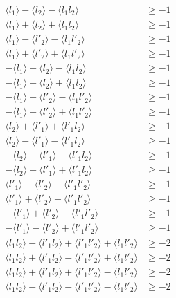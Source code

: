 \begin{equation}
\begin{aligned}\label{eq:nonmodineq}
\langle l_1 \rangle - \langle l_2 \rangle - \langle l_1 l_2 \rangle &\geq -1\\
\langle l_1 \rangle + \langle l_2 \rangle + \langle l_1 l_2 \rangle &\geq -1\\
\langle l_1 \rangle - \langle l'_2 \rangle - \langle l_1 l'_2 \rangle &\geq -1\\
\langle l_1 \rangle + \langle l'_2 \rangle + \langle l_1 l'_2 \rangle &\geq -1\\
-\langle l_1 \rangle + \langle l_2 \rangle - \langle l_1 l_2 \rangle &\geq -1\\
-\langle l_1 \rangle - \langle l_2 \rangle + \langle l_1 l_2 \rangle &\geq -1\\
-\langle l_1 \rangle + \langle l'_2 \rangle - \langle l_1 l'_2 \rangle &\geq -1\\
-\langle l_1 \rangle - \langle l'_2 \rangle + \langle l_1 l'_2 \rangle &\geq -1\\
\langle l_2 \rangle + \langle l'_1 \rangle + \langle l'_1 l_2 \rangle &\geq -1\\
\langle l_2 \rangle - \langle l'_1 \rangle - \langle l'_1 l_2 \rangle &\geq -1\\
-\langle l_2 \rangle + \langle l'_1 \rangle - \langle l'_1 l_2 \rangle &\geq -1\\
-\langle l_2 \rangle - \langle l'_1 \rangle + \langle l'_1 l_2 \rangle &\geq -1\\
\langle l'_1 \rangle - \langle l'_2 \rangle - \langle l'_1 l'_2 \rangle &\geq -1\\
\langle l'_1 \rangle + \langle l'_2 \rangle + \langle l'_1 l'_2 \rangle &\geq -1\\
-\langle l'_1 \rangle + \langle l'_2 \rangle - \langle l'_1 l'_2 \rangle &\geq -1\\
-\langle l'_1 \rangle - \langle l'_2 \rangle + \langle l'_1 l'_2 \rangle &\geq -1\\
\langle l_1 l_2 \rangle - \langle l'_1 l_2 \rangle + \langle l'_1 l'_2 \rangle + \langle l_1 l'_2 \rangle &\geq -2\\
\langle l_1 l_2 \rangle + \langle l'_1 l_2 \rangle - \langle l'_1 l'_2 \rangle + \langle l_1 l'_2 \rangle &\geq -2\\
\langle l_1 l_2 \rangle + \langle l'_1 l_2 \rangle + \langle l'_1 l'_2 \rangle - \langle l_1 l'_2 \rangle &\geq -2\\
\langle l_1 l_2 \rangle - \langle l'_1 l_2 \rangle - \langle l'_1 l'_2 \rangle - \langle l_1 l'_2 \rangle &\geq -2\\

\end{aligned}
\end{equation}
